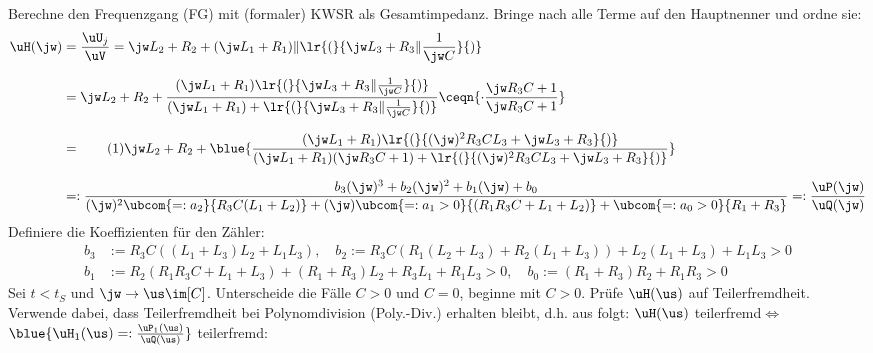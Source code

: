 %
\newcommand{\defaultPath}{/run/media/lvdw/DATA/docs/latex_def/}




%

\allowdisplaybreaks
\reversemarginpar
\newcommand{\numberthis}[1]{%
	\stepcounter{equation}\tag{\theequation}\label{#1}%
}%

%
%
%
\noindent Berechne den Frequenzgang (FG) mit (formaler) KWSR als Gesamtimpedanz. Bringe nach  alle Terme auf den Hauptnenner und ordne sie:
\begin{align*}%
	\uH(\jw)&=\frac{\uU_j}{\uV}=\jw L_2+R_2+(\jw L_1+R_1)\|\lr{(}{%
		\jw L_3+R_3\|\frac{1}{\jw C}%
	}{)}\\[2.5mm]%
%
	&=\jw L_2+R_2+\frac{%
		(\jw L_1+R_1)\lr{(}{%
			\jw L_3+R_3\|\frac{1}{\jw C}%
		}{)}
	}{%
		(\jw L_1+R_1)+\lr{(}{%
			\jw L_3+R_3\|\frac{1}{\jw C}%
		}{)}%
	}\ceqn{%
		\cdot\frac{\jw R_3C+1}{\jw R_3C+1}%
	}\\[2.5mm]%
%
	&=\numberthis{a1a_FG_Poly1}\jw L_2+R_2+\blue{\frac{%
		(\jw L_1+R_1)\lr{(}{%
			(\jw)^2R_3CL_3+\jw L_3+R_3%
		}{)}%
	}{%
		(\jw L_1+R_1)(\jw R_3C+1)+\lr{(}{%
			(\jw)^2R_3CL_3+\jw L_3+R_3%
		}{)}%
	}}\\[2.5mm]%
%
	&=:\frac{%
		b_3(\jw)^3+b_2(\jw)^2+b_1(\jw)+b_0%
	}{%
		(\jw)^2\ubcom{=:a_2}{R_3C(L_1+L_2)}+(\jw)\ubcom{=:a_1>0}{(R_1R_3C+L_1+L_2)}+\ubcom{=:a_0>0}{R_1+R_3}%
	}=:\frac{\uP(\jw)}{\uQ(\jw)}%
\end{align*}
%
Definiere die Koeffizienten für den Zähler:
\begin{align*}
	b_3&:=R_3C((L_1+L_3)L_2+L_1L_3),\quad b_2:=R_3C(R_1(L_2+L_3)+R_2(L_1+L_3))+L_2(L_1+L_3)+L_1L_3>0\\[2.5mm]%
%
	b_1&:=R_2(R_1R_3C+L_1+L_3)+(R_1+R_3)L_2+R_3L_1+R_1L_3>0,\quad b_0:=(R_1+R_3)R_2+R_1R_3>0%
\end{align*}%
%
%
%
Sei $t<t_S$ und $\jw\rightarrow\us\im[C]$. Unterscheide die Fälle $C>0$ und $C=0$, beginne mit $C>0$. Prüfe $\uH(\us)$ auf Teilerfremdheit. Verwende dabei, dass Teilerfremdheit bei Polynomdivision (Poly.-Div.) erhalten bleibt, d.h. aus  folgt: \glqq$\uH(\us)$ teilerfremd\grqq $\Leftrightarrow$ \glqq$\blue{%
	\uH_1(\us)=:\frac{\uP_1(\us)}{\uQ(\us)}%
}$ teilerfremd\grqq:
